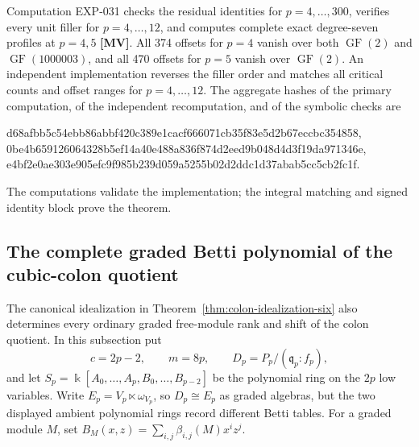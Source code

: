 \documentclass[11pt]{article}
\theoremstyle{definition}
\theoremstyle{remark}
\newcommand{\kfield}{\Bbbk}
\begin{document}
Computation EXP-031 checks the residual identities for $p=4,\ldots,300$, verifies every unit
filler for $p=4,\ldots,12$, and computes complete exact degree-seven profiles at $p=4,5$
\textbf{[MV]}.
All 374 offsets for $p=4$ vanish over both $\operatorname{GF}(2)$ and
$\operatorname{GF}(1000003)$, and all 470 offsets for $p=5$ vanish over
$\operatorname{GF}(2)$. An independent implementation reverses the filler order and matches all
critical counts and offset ranges for $p=4,\ldots,12$. The aggregate hashes of the primary
computation, of the independent recomputation, and of the symbolic checks are
\begin{center}
{\fontsize{7}{8}\selectfont\ttfamily d68afbb5c54ebb86abbf420c389e1cacf666071cb35f83e5d2b67eccbc354858},\\
{\fontsize{7}{8}\selectfont\ttfamily 0be4b659126064328b5ef14a40e488a836f874d2eed9b048d4d3f19da971346e},\\
{\fontsize{7}{8}\selectfont\ttfamily e4bf2e0ae303e905efc9f985b239d059a5255b02d2ddc1d37abab5cc5cb2fc1f}.
\end{center}
The computations validate the implementation; the integral matching and signed identity block
prove the theorem.

\subsection{The complete graded Betti polynomial of the cubic-colon quotient}

The canonical idealization in Theorem~\ref{thm:colon-idealization-six} also determines every
ordinary graded free-module rank and shift of the colon quotient. In this subsection put
\[
c=2p-2,\qquad m=8p,\qquad D_p=P_p/(\mathfrak q_p:f_p),
\]
and let \(S_p=\kfield[A_0,\ldots,A_p,B_0,\ldots,B_{p-2}]\) be the polynomial ring on the \(2p\)
low variables. Write \(E_p=V_p\ltimes\omega_{V_p}\), so \(D_p\cong E_p\) as graded algebras, but
the two displayed ambient polynomial rings record different Betti tables. For a graded module
\(M\), set \(B_M(x,z)=\sum_{i,j}\beta_{i,j}(M)x^iz^j\).
\end{document}
